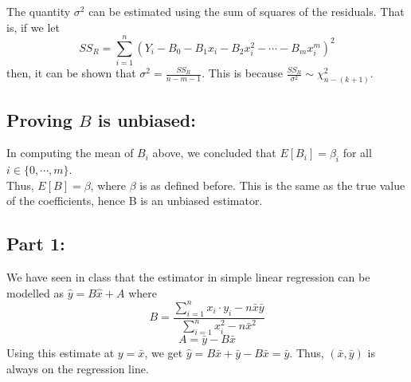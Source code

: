 The quantity $\sigma^2$ can be estimated using the sum of squares of the residuals. That is, if we let
\[
    SS_R=\sum_{i=1}^n (Y_i - B_0 - B_1 x_i - B_2 x_i^2 - \cdots - B_m x_i^m)^2
\] 
then, it can be shown that $\sigma^2 = \frac{SS_R}{n-m-1}$. This is because $\frac{SS_R}{\sigma^2} \sim \chi_{n-(k+1)}^2$.
\subsection{Proving $B$ is unbiased: }
In computing the mean of $B_i$ above, we concluded that $E[B_i]=\beta_i$ for all $i\in\{0,\cdots,m\}$.\\
Thus, $E[B]=\beta$, where $\beta$ is as defined before. This is the same as the true value of the coefficients, hence B is an unbiased estimator.\\ 
\subsection{Part 1: }
We have seen in class that the estimator in simple linear regression can be modelled as $\hat{y}=B \hat{x} + A$ where \[
    B=\frac{\sum_{i=1}^{n}x_i\cdot y_i - n \bar{x}\bar{y}}{\sum_{i=1}^{n}x_i^2 - n \bar{x}^2}
\]
\[
    A=\bar{y} - B\bar{x}
\]
Using this estimate at $y=\bar{x}$, we get $\hat{y}=B \bar{x}+\bar{y}-B\bar{x} = \bar{y}$. Thus, $(\bar{x}, \bar{y})$ is always on the regression line.\\
